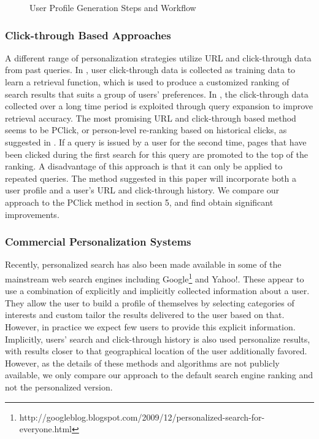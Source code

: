 \documentclass{sig-alternate}
\begin{document}
\begin{figure*}
\centering
{}
\caption{User Profile Generation Steps and Workflow}
\label{fig:workflow}
\end{figure*}

\subsubsection*{Click-through Based Approaches}

A different range of personalization strategies utilize URL and click-through data from past queries. In \cite{Joachims:Opt}, user click-through data is collected as training data to learn a retrieval function, which is used to produce a customized ranking of search results that suits a group of users' preferences. In \cite{Sugiyama:Hatano, Speretta:Gauch, Sun:Zeng}, the click-through data collected over a long time period is exploited through query expansion to improve retrieval accuracy. The most promising URL and click-through based method seems to be PClick, or person-level re-ranking based on historical clicks, as suggested in \cite{Dou:Song}. If a query is issued by a user for the second time, pages that have been clicked during the first search for this query are promoted to the top of the ranking. A disadvantage of this approach is that it can only be applied to repeated queries. The method suggested in this paper will incorporate both a user profile and a user's URL and click-through history. We compare our approach to the PClick method in section 5, and find obtain significant improvements.

\subsubsection*{Commercial Personalization Systems}

Recently, personalized search has also been made available in some of the mainstream web search engines including  Google\footnote{http://googleblog.blogspot.com/2009/12/personalized-search-for-everyone.html} and Yahoo!. These appear to use a combination of explicitly and implicitly collected information about a user. They allow the user to build a profile of themselves by selecting categories of interests and custom tailor the results delivered to the user based on that. However, in practice we expect few users to provide this explicit information. Implicitly, users' search and click-through history is also used personalize results, with results closer to that geographical location of the user additionally favored. However, as the details of these methods and algorithms are not publicly available, we only compare our approach to the default search engine ranking and not the personalized version.
\end{document}

